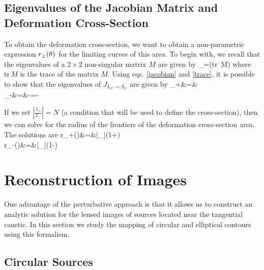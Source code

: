 \subsection{Eigenvalues of the Jacobian Matrix and Deformation Cross-Section}

To obtain the deformation cross-section, we want to obtain a
non-parametric expression $r_\pm (\theta)$ for the limiting curves of this area. To
begin with, we recall that the eigenvalues of a $2\times 2$ non-singular matrix
$M$
are given by
\beq
\lambda_\pm=\left(\mbox{tr}\, M\pm{}\right)\label{eigenvalues}
\eeq 
where $\mbox{tr}\, M$ is the trace of the matrix $M$. Using eqs. \ref{jacobian}
and \ref{trace}, it is possible to show that the eigenvalues of $J_{L_C\rightarrow
S_C}$ are given by
\bea
\lambda_{+}&=&\kt\label{eigenvalue1}\\
\lambda_{-}&=&-=-\label{eigenvalue2}
\eea


If we set $\left|\frac{\lambda_+}{\lambda_-}\right|=N$ (a condition that will be used to define the
cross-section), then we can solve for the radius of the frontiers of the deformation cross-section area. The solutions are
\bea
r_{+}(\te)&=&\left|_{}\right|\left(1+\right)\label{rmax}\\
r_{-}(\te)&=&\left|_{}\right|\left(1-\right)\label{rmin}
\eea


\section{Reconstruction of Images}

One advantage of the perturbative approach is that it allows us to
construct an analytic solution for the lensed images of sources
located near the tangential caustic.  In this section we study the
mapping of circular and elliptical contours using this formalism.

\subsection{Circular Sources}

